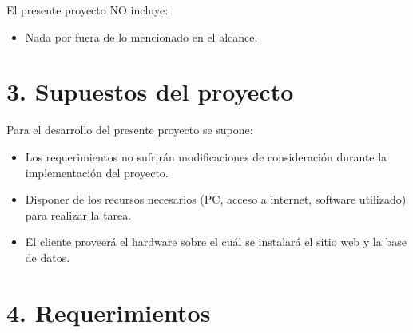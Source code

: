 \documentclass[11pt]{charter}
\begin{document}
El presente proyecto NO incluye:
\begin{itemize}
\item Nada por fuera de lo mencionado en el alcance.
\end{itemize}


\section{3. Supuestos del proyecto}
\label{sec:supuestos}

Para el desarrollo del presente proyecto se supone:

\begin{itemize}
\item Los requerimientos no sufrirán modificaciones de consideración durante la implementación del proyecto.
\item Disponer de los recursos necesarios (PC, acceso a internet, software utilizado) para realizar la tarea.
\item El cliente proveerá el hardware sobre el cuál se instalará el sitio web y la base de datos.
\end{itemize}


\section{4. Requerimientos}
\label{sec:requerimientos}
\end{document}

